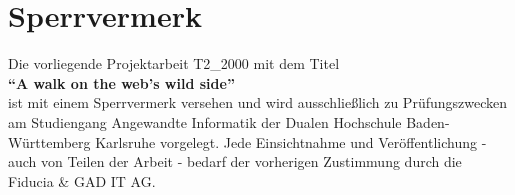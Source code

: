 \newpage

\chapter*{Sperrvermerk}
\vspace*{2em}

Die vorliegende Projektarbeit T2\_2000 mit dem Titel \\
\textbf{\enquote{A walk on the web's wild side}}
\\ ist mit einem Sperrvermerk versehen und wird ausschließlich zu
Prüfungszwecken am Studiengang Angewandte Informatik der Dualen Hochschule
Baden-Württemberg Karlsruhe vorgelegt. Jede Einsichtnahme und Veröffentlichung -
auch von Teilen der Arbeit - bedarf der vorherigen Zustimmung durch die Fiducia
\& GAD IT AG.

